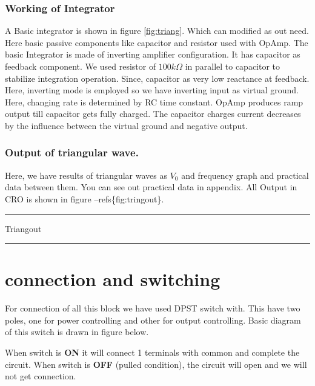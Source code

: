 \documentclass[14pt,a4paper]{extarticle}
\begin{document}
\subsubsection{Working of Integrator}
\label{sec:org0e811b9}

A Basic integrator is shown in figure \ref{fig:triang}. Which can modified as out need. Here basic passive components like capacitor and resistor used with OpAmp. The basic Integrator is made of inverting amplifier configuration. It has capacitor as feedback component. We used resistor of \(100k\Omega\) in parallel to capacitor to stabilize integration operation. Since, capacitor as very low reactance at feedback. Here, inverting mode is employed so we have inverting input as virtual ground. Here, changing rate is determined by RC time constant. OpAmp produces ramp output till capacitor gets fully charged. The capacitor charges current decreases by the influence between the virtual ground and negative output.


\subsubsection{Output of triangular wave.}
\label{sec:orge12749a}

Here, we have results of triangular waves as \(V_0\) and frequency graph and practical data between them. You can see out practical data in appendix. All Output in CRO is shown in figure --refs\{fig:tringout\}. 

\noindent\rule{\textwidth}{0.5pt}
Triangout

\noindent\rule{\textwidth}{0.5pt}


\section{connection and switching}
\label{sec:org5e5e0f0}

For connection of all this block we have used DPST switch with. This have two poles, one for power controlling and other for output controlling. Basic diagram of this switch is drawn in figure below.

When switch is \textbf{\textbf{ON}} it will connect 1 terminals with common and complete the circuit. When switch is \textbf{\textbf{OFF}} (pulled condition), the circuit will open and we will not get connection.
\end{document}
